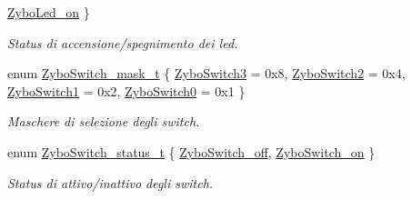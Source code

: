 \begin{DoxyCompactItemize}
\hyperlink{group___zybo_gga3dcb274f22e577705c49944b8d1f4b12aafcf0ae16a6edec807c06bb0a99f7e8b}{Zybo\+Led\+\_\+on}
 \}
\begin{DoxyCompactList}\small\item\em Status di accensione/spegnimento dei led. \end{DoxyCompactList}\item 
enum \hyperlink{group___zybo_ga2e0602a824354f25c395f938caba3703}{Zybo\+Switch\+\_\+mask\+\_\+t} \{ \hyperlink{group___zybo_gga2e0602a824354f25c395f938caba3703a73ccea5ad8c919fe962e9a67a3733ee3}{Zybo\+Switch3} = 0x8, 
\hyperlink{group___zybo_gga2e0602a824354f25c395f938caba3703aac2f5ebb28eb3bd93fcdf8019b6a3e9e}{Zybo\+Switch2} = 0x4, 
\hyperlink{group___zybo_gga2e0602a824354f25c395f938caba3703a694a25c87b1ec597d2a6032bf5d34b0f}{Zybo\+Switch1} = 0x2, 
\hyperlink{group___zybo_gga2e0602a824354f25c395f938caba3703a84350e8b6e7a7e2cabf22fc7a1a5c651}{Zybo\+Switch0} = 0x1
 \}
\begin{DoxyCompactList}\small\item\em Maschere di selezione degli switch. \end{DoxyCompactList}\item 
enum \hyperlink{group___zybo_ga4ba6b49b2f47ebb464aefcea7e23e04a}{Zybo\+Switch\+\_\+status\+\_\+t} \{ \hyperlink{group___zybo_gga4ba6b49b2f47ebb464aefcea7e23e04aa1d686faf83e8606e68eec0b7e525a755}{Zybo\+Switch\+\_\+off}, 
\hyperlink{group___zybo_gga4ba6b49b2f47ebb464aefcea7e23e04aafba009508b8822de867af69034e3e4f8}{Zybo\+Switch\+\_\+on}
 \}
\begin{DoxyCompactList}\small\item\em Status di attivo/inattivo degli switch. \end{DoxyCompactList}\end{DoxyCompactItemize}
